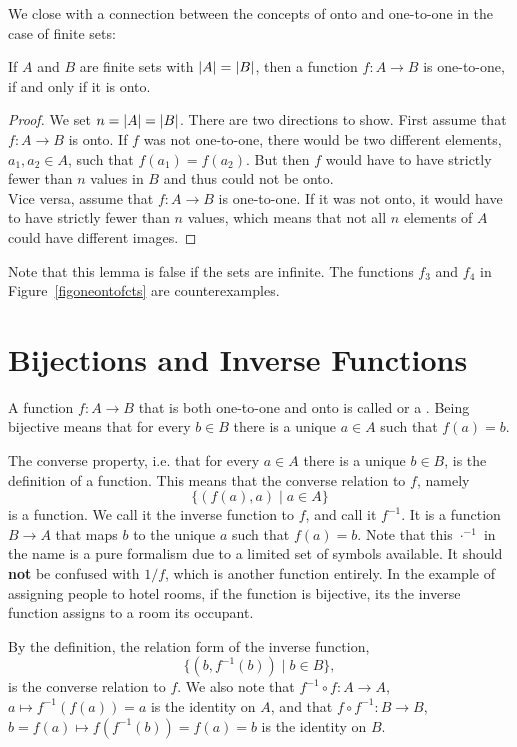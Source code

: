 We close with a connection between the concepts of onto and one-to-one in
the case of finite sets:
\begin{lemma}
\label{lemoneonto}
If $A$ and $B$ are finite sets with $\left|A\right|=\left|B\right|$, then a function $f\colon A\to B$ is
one-to-one, if and only if it is onto.
\end{lemma}
\begin{proof}
We set $n=\left|A\right|=\left|B\right|$.
There are two directions to show. First assume that $f\colon A\to B$ is onto. If $f$ was
not one-to-one, there would be two different elements, $a_1,a_2\in A$, such that
$f(a_1)=f(a_2)$. But then $f$ would have to have strictly fewer than $n$ values in $B$
and thus could not be onto.\\
Vice versa, assume that $f\colon A\to B$ is one-to-one. If it was not onto, it would
have to have strictly fewer than $n$ values, which means that not all $n$ elements of
$A$ could have different images.
\end{proof}
Note that this lemma is false if the sets are infinite. The functions $f_3$ and $f_4$ in
Figure~\ref{figoneontofcts} are counterexamples.

\section{Bijections and Inverse Functions}

A function $f\colon A\to B$ that is both one-to-one and onto is called
 or a . Being bijective means that for every $b\in
B$ there is a unique $a\in A$ such that $f(a)=b$.

The converse property, i.e. that for every
$a\in A$ there is a unique $b\in B$, is the definition of a function. This means that
the converse relation to $f$, namely
\[
\{(f(a),a)\mid a\in A\}
\]
is a function. We call it the inverse function to $f$, and call it $f^{-1}$. It is a
function $B\to A$ that maps $b$ to the unique $a$ such that $f(a)=b$.
Note that
this $\cdot^{-1}$ in the name is a pure formalism due to a limited set of symbols available. It
should \textbf{not} be confused with $1/f$, which is another function entirely.
In the example of assigning people to hotel rooms, if the function is bijective, its the
inverse function assigns to a room its occupant.

By the definition, the relation form of the inverse function,
\[
\{(b,f^{-1}(b))\mid b\in B\},
\]
is the converse relation to $f$. We also
note that $f^{-1}\circ f\colon A\to A$, $a\mapsto f^{-1}(f(a))=a$ is the identity
on $A$, and that $f\circ f^{-1}\colon B\to B$, $b=f(a)\mapsto f(f^{-1}(b))=f(a)=b$ is
the identity on $B$.
\medskip

